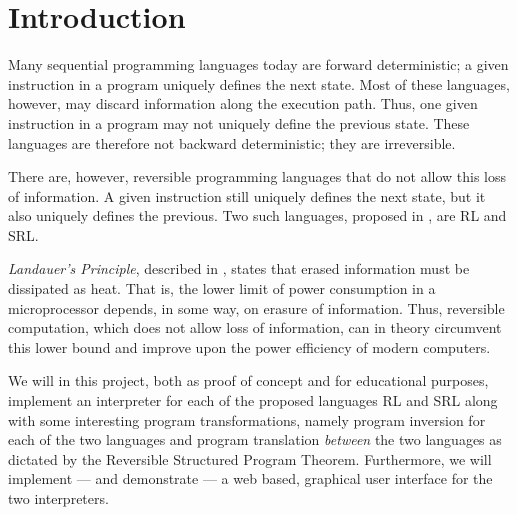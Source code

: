 \chapter*{Introduction}
 

Many sequential programming languages today are forward deterministic; a given instruction in a program uniquely defines the next state. Most of these languages, however, may discard information along the execution path. Thus, one given instruction in a program may not uniquely define the previous state. These languages are therefore not backward deterministic; they are irreversible.

There are, however, reversible programming languages that do not allow this loss of information. A given instruction still uniquely defines the next state, but it also uniquely defines the previous. Two such languages, proposed in \cite{REV}, are RL and SRL.

\textit{Landauer's Principle}, described in \cite{LAN}, states that erased information must be dissipated as heat. That is, the lower limit of power consumption in a microprocessor depends, in some way, on erasure of information. Thus, reversible computation, which does not allow loss of information, can in theory circumvent this lower bound and improve upon the power efficiency of modern computers.

We will in this project, both as proof of concept and for educational purposes, implement an interpreter for each of the proposed languages RL and SRL along with some interesting program transformations, namely program inversion for each of the two languages and program translation \textit{between} the two languages as dictated by the Reversible Structured Program Theorem. Furthermore, we will implement --- and demonstrate --- a web based, graphical user interface for the two interpreters.
